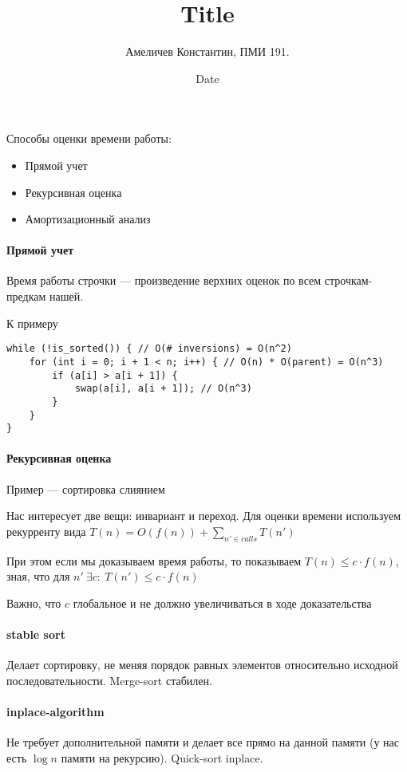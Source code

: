 \documentclass[12pt]{article}
\title{Title}
\author{Амеличев Константин, ПМИ 191.}
\date{Date}
\newcommand{\rangesum}[2]{\displaystyle \sum_{#1}^{#2}}
\begin{document}
Способы оценки времени работы:
\begin{itemize}
\item Прямой учет

\item Рекурсивная оценка

\item Амортизационный анализ
\end{itemize}

\paragraph{Прямой учет}

Время работы строчки --- произведение верхних оценок по всем строчкам-предкам нашей.

К примеру

\begin{verbatim}
while (!is_sorted()) { // O(# inversions) = O(n^2)
    for (int i = 0; i + 1 < n; i++) { // O(n) * O(parent) = O(n^3)
        if (a[i] > a[i + 1]) {
            swap(a[i], a[i + 1]); // O(n^3)
        }
    }
}
\end{verbatim}

\paragraph{Рекурсивная оценка}

Пример --- сортировка слиянием

Нас интересует две вещи: инвариант и переход. Для оценки времени используем рекурренту вида $T(n) = O(f(n)) + \rangesum{n' \in calls}{} T(n')$ 

При этом если мы доказываем время работы, то показываем $T(n) \le c \cdot f(n)$, зная, что для $n'\ \exists c:\ T(n') \le c \cdot f(n)$

Важно, что $c$  глобальное и не должно увеличиваться в ходе доказательства


\paragraph{stable sort}
Делает сортировку, не меняя порядок равных элементов относительно исходной последовательности. Merge-sort стабилен.
\paragraph{inplace-algorithm}
Не требует дополнительной памяти и делает все прямо на данной памяти (у нас есть $\log n$ памяти на рекурсию). Quick-sort inplace.
\end{document}
